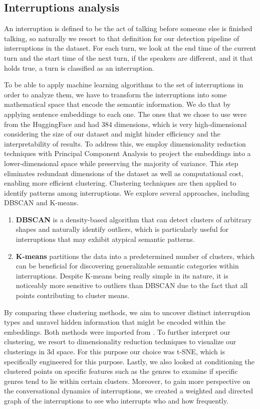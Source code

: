 \documentclass{article}
\begin{document}
\subsection{Interruptions analysis}
An interruption is defined to be the act of talking before someone else is finished talking, so naturally we resort to that definition for our detection pipeline of interruptions in the dataset. For each turn, we look at the end time of the current turn and the start time of the next turn, if the speakers are different, and it that holds true, a turn is classified as an interruption. 

To be able to apply machine learning algorithms to the set of interruptions in order to analyze them, we have to transform the interruptions into some mathematical space that encode the semantic information. We do that by applying sentence embeddings to each one. The ones that we chose to use were from the HuggingFace and had 384 dimensions, which is very high-dimensional considering the size of our dataset and might hinder efficiency and the interpretability of results. To address this, we employ dimensionality reduction techniques with Principal Component Analysis to project the embeddings into a lower-dimensional space while preserving the majority of variance. This step eliminates redundant dimensions of the dataset as well as computational cost, enabling more efficient clustering. Clustering techniques are then applied to identify patterns among interruptions. We explore several approaches, including DBSCAN and K-means. 

\begin{enumerate}[leftmargin=*]

\item \textbf{DBSCAN} is a density-based algorithm that can detect clusters of arbitrary shapes and naturally identify outliers, which is particularly useful for interruptions that may exhibit atypical semantic patterns. 

\item \textbf{ K-means} partitions the data into a predetermined number of clusters, which can be beneficial for discovering generalizable semantic categories within interruptions. Despite K-means being really simple in its nature, it is noticeably more sensitive to outliers than DBSCAN due to the fact that all points contributing to cluster means.

\end{enumerate}

By comparing these clustering methods, we aim to uncover distinct interruption types and unravel hidden information that might be encoded within the embeddings. Both methods were imported from \cite{scikitlearn_clustering}. To further interpret our clustering, we resort to dimensionality reduction techniques to visualize our clusterings in 3d space. For this purpose our choice was t-SNE, which is specifically engineered for this purpose. Lastly, we also looked at conditioning the clustered points on specific features such as the genres to examine if specific genres tend to lie within certain clusters. Moreover, to gain more perspective on the conversational dynamics of interruptions, we created a weighted and directed graph of the interruptions to see who interrupts who and how frequently.
\end{document}
